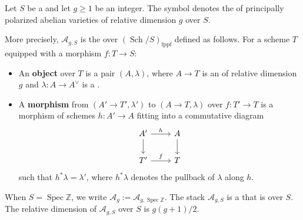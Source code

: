 

\begin{definition} \label{definition:moduli_of_principally_polarized_abelian_varieties}
    Let $S$ be a  and let $g \geq 1$ be an integer. The symbol  denotes the  of principally polarized abelian varieties of relative dimension $g$ over $S$.

    More precisely, $\mathcal{A}_{g,S}$ is the  over $(\operatorname{Sch}/S)_{\text{fppf}}$ defined as follows. For a scheme $T$ equipped with a morphism $f: T \to S$:
    \begin{itemize}
        \item An \textbf{object} over $T$ is a pair $(A, \lambda)$, where $A \to T$ is an  of relative dimension $g$ and $\lambda: A \to A^\vee$ is a .
        \item A \textbf{morphism} from $(A' \to T', \lambda')$ to $(A \to T, \lambda)$ over $f: T' \to T$ is a morphism of schemes $h: A' \to A$ fitting into a commutative diagram
        $$\begin{tikzcd}
            A' \ar[r, "h"] \ar[d] & A \ar[d] \\
            T' \ar[r, "f"] & T
        \end{tikzcd}$$
        such that $h^*\lambda = \lambda'$, where $h^*\lambda$ denotes the pullback of $\lambda$ along $h$.
    \end{itemize}

    When $S = \operatorname{Spec} \mathbb{Z}$, we write $\mathcal{A}_g := \mathcal{A}_{g,\operatorname{Spec} \mathbb{Z}}$. The stack $\mathcal{A}_{g,S}$ is a  that is  over $S$. The relative dimension of $\mathcal{A}_{g,S}$ over $S$ is $g(g+1)/2$.
\end{definition}